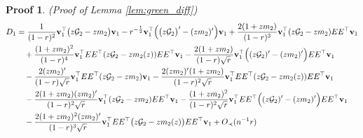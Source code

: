 \documentclass[12pt]{article}
\numberwithin{equation}{section}
\newtheorem{myPro}{Proof}
\theoremstyle{remark}
\newcommand{\1}{{\rm 1}\kern-0.24em{\rm I}}
\begin{document}
\begin{appendices}
\begin{myPro}{(Proof of Lemma \ref{lem:green_diff})}
\begin{align} \label{est:D_1}
D_1&= \frac{1}{(1-r)^2} {\bf v}_1^{\top}\big( z\mathcal{G}_2-zm_2\big){\bf v}_1
-r^{-\frac 12}{\bf v}_1^{\top}\Big( \big(z\mathcal{G}_2\big)' - (zm_2)'\Big){\bf v}_1 + \frac{2(1+zm_2)}{(1-r)^3}{\bf v}_1^{\top} ( z\mathcal{G}_2- zm_2) {E}{E}^{\top} {\bf v}_1\notag\\
&\quad + \frac{(1+zm_2)^2}{(1-r)^4}{\bf v}_1^{\top} {E}{E}^{\top} (z\mathcal{G}_2 - zm_2(z)){E}{E}^{\top}{\bf v}_1 - \frac{2(1+zm_2)}{(1-r)\sqrt r}{\bf v}_1^{\top} \Big((z\mathcal{G}_2)'-(zm_2)'\Big) {E}{E}^{\top} {\bf v}_1 \notag\\
&\quad -\frac{2(zm_2)'}{(1-r)\sqrt r}{\bf v}_1^{\top}  {E}{E}^{\top} (z\mathcal{G}_2-zm_2){\bf v}_1 -  \frac{2(zm_2)'(1+zm_2)}{(1-r)^2\sqrt r}{\bf v}_1^{\top} {E}{E}^{\top} (z\mathcal{G}_2 - zm_2(z)){E}{E}^{\top}{\bf v}_1\notag\\
&\quad - \frac{2(1+zm_2)(zm_2)'}{(1-r)^2\sqrt r}{\bf v}_1^{\top} ( z\mathcal{G}_2-zm_2) {E}{E}^{\top} {\bf v}_1 -\frac{(1+zm_2)^2}{(1-r)^2\sqrt r}{\bf v}_1^{\top}  {E}{E}^{\top} \Big((z\mathcal{G}_2 )'- (zm_2)'\Big){E}{E}^{\top}{\bf v}_1 \notag\\
&\quad - \frac{2(1+zm_2)^2(zm_2)'}{(1-r)^3\sqrt r}  {\bf v}_1^{\top} {E}{E}^{\top} \big( z\mathcal{G}_2 -zm_2(z)\big)  {E}{E}^{\top}{\bf v}_1+ O_\prec(n^{-1}r)\notag\\

\end{align}
\end{myPro}
\end{appendices}
\end{document}
